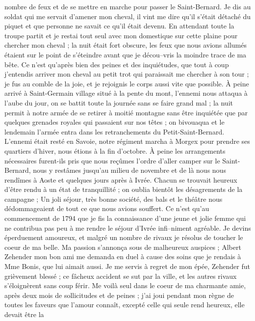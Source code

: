 \documentclass[12pt]{article}
\begin{document}
 nombre de feux et de se mettre en marche pour
passer le Saint-Bernard. Je dis au soldat qui me servait d’amener mon cheval, il vint me dire qu’il
s’était détaché du piquet et que personne ne savait ce qu’il était devenu. En attendant toute la
troupe partit et je restai tout seul avec mon domestique sur cette plaine pour chercher mon cheval ;
la nuit était fort obscure, les feux que nous avions allumés étaient sur le point de s’éteindre
avant que je décou–vris la moindre trace de ma bête. Ce n’est qu’après bien des peines et des
inquiétudes, que tout à coup j’entendis arriver mon cheval au petit trot qui paraissait me chercher
à son tour ; je fus au comble de la joie, et je rejoignis le corps aussi vite que possible. À peine
arrivé à Saint-Germain village situé à la pente du mont, l’ennemi nous attaqua à l’aube du jour, on
se battit toute la journée sans se faire grand mal ; la nuit permit à notre armée de se retirer à
moitié montagne sans être inquiétée que par quelques grenades royales qui passaient sur nos têtes ;
on bivouaqua et le lendemain l’armée entra dans les retranchements du Petit-Saint-Bernard. L’ennemi
était resté en Savoie, notre régiment marcha à Morgex pour prendre ses quartiers d’hiver, nous
étions à la fin d’octobre. À peine les arrangements nécessaires furent-ils pris que nous reçûmes
l’ordre d’aller camper sur le Saint-Bernard, nous y restâmes jusqu’au milieu de novembre et de là
nous nous rendîmes à Aoste et quelques jours après à Ivrée. Chacun se trouvait heureux d’être rendu
à un état de tranquillité ; on oublia bientôt les désagrements de la campagne ; Un joli séjour, très
bonne société, des bals et le théâtre nous dédommageaient de tout ce que nous avions souffert. Ce
n’est qu’au commencement de 1794 que je fis la connaissance d’une jeune et jolie femme qui ne
contribua pas peu à me rendre le séjour d’Ivrée infi–niment agréable. Je devins éperduement
amoureux, et malgré un nombre de rivaux je résolus de toucher le coeur de ma belle. Ma passion
s’annonça sous de malheureux auspices ; Albert Zehender mon bon ami me demanda en duel à cause des
soins que je rendais à Mme Bonis, que lui aimait aussi. Je me servis à regret de mon épée, Zehender
fut grièvement blessé ; ce fâcheux accident se sut par la ville, et les autres rivaux s’éloignèrent
sans coup férir. Me voilà seul dans le coeur de ma charmante amie, après deux mois de sollicitudes
et de peines ; j’ai joui pendant mon règne de toutes les faveurs que l’amour connaît, excepté celle
qui seule rend heureux, elle devait être la
\end{document}

